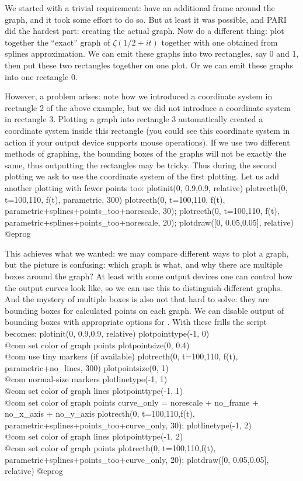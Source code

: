 We started with a trivial requirement: have an additional frame around
the graph, and it took some effort to do so.  But at least it was possible,
and PARI did the hardest part: creating the actual graph.
Now do a different thing: plot together the ``exact'' graph of
$\zeta({1/2}+it)$ together with one obtained from splines approximation.
We can emit these graphs into two rectangles, say 0 and 1, then put these
two rectangles together on one plot.  Or we can emit these graphs into one
rectangle 0.

However, a problem arises: note how we
introduced a coordinate system in rectangle 2 of the above example, but we
did not introduce a coordinate system in rectangle 3.  Plotting a
graph into rectangle 3 automatically created a coordinate system
inside this rectangle (you could see this coordinate system in action
if your output device supports mouse operations).  If we use two different
methods of graphing, the bounding boxes of the graphs will not be exactly
the same, thus outputting the rectangles may be tricky.  Thus during
the second plotting we ask  to use the coordinate system of
the first plotting.  Let us add another plotting with fewer
points too:
\bprog
  plotinit(0, 0.9,0.9, relative)
  plotrecth(0, t=100,110, f(t), parametric, 300)
  plotrecth(0, t=100,110, f(t), parametric+splines+points_too+norescale, 30);
  plotrecth(0, t=100,110, f(t), parametric+splines+points_too+norescale, 20);
  plotdraw([0, 0.05,0.05], relative)
@eprog

This achieves what we wanted: we may compare different ways to plot a graph,
but the picture is confusing: which graph is what, and why there are multiple
boxes around the graph?  At least with some output devices one can control
how the output curves look like, so we can use this to distinguish different
graphs.  And the mystery of multiple boxes is also not that hard to solve:
they are bounding boxes for calculated points on each graph.  We can disable
output of bounding boxes with appropriate options for .
With these frills the script becomes:
\bprog
  plotinit(0, 0.9,0.9, relative)
  plotpointtype(-1, 0)                \\@com set color of graph points
  plotpointsize(0, 0.4)               \\@com use tiny markers (if available)
  plotrecth(0, t=100,110, f(t), parametric+no_lines, 300)
  plotpointsize(0, 1)                 \\@com normal-size markers
  plotlinetype(-1, 1)                 \\@com set color of graph lines
  plotpointtype(-1, 1)                \\@com set color of graph points
  curve_only = norescale + no_frame + no_x_axis + no_y_axis
  plotrecth(0, t=100,110,f(t), parametric+splines+points_too+curve_only, 30);
  plotlinetype(-1, 2)                 \\@com set color of graph lines
  plotpointtype(-1, 2)                \\@com set color of graph points
  plotrecth(0, t=100,110,f(t), parametric+splines+points_too+curve_only, 20);
  plotdraw([0, 0.05,0.05], relative)
@eprog

